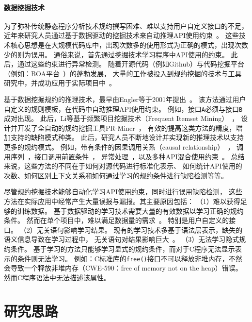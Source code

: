 \paragraph{数据挖掘技术}
为了弥补传统静态程序分析技术规约撰写困难、难以支持用户自定义接口的不足，
近年来研究人员通过基于数据驱动的挖掘技术来自动推理API使用约束~\cite{13survey}。
这些技术核心思想是在大规模代码库中，出现次数多的使用形式为正确的模式，出现次数少的则为误用。
通俗来说，首先通过挖掘技术学习程序中API使用的约束。
此后，通过这些约束进行异常检测。
随着开源代码（例如Github）与代码挖掘平台（例如：BOA平台~\cite{15-tosem-boa}）的蓬勃发展，
大量的工作被投入到规约挖掘的技术与工具研究中，并成功应用于实际项目中~\cite{survey18}。

基于数据挖掘规约的推理技术，最早由Engler等于2001年提出~\cite{01-sosp-mining}。
该方法通过用户自定义的规则模板，在代码中自动推理API使用约束。
例如，接口\texttt{A}必须与接口\texttt{B}成对出现。
此后，Li等基于频繁项目挖掘技术（Frequent Itemset Mining）~\cite{03-fimi-frequent}，
设计并开发了全自动的规约挖掘工具PR-Miner~\cite{05-fse-prminer}，
有效的提高这类方法的精度，增加支持的缺陷模式种类。
此后，研究人员不断地设计并实现新的推理技术以支持更多的规约模式。
例如，带有条件的因果调用关系（causal relationship）~\cite{07-fse-temporal}，
调用序列~\cite{09-ase-sequence}，接口调用前置条件~\cite{14-fse-pre}，
异常处理~\cite{16-ase-apex}，以及多种API混合使用约束~\cite{16-sec-apisan}。
总结来说，这些方法的不同在于如何对源代码进行标准化表示、
如何统计API使用的次数、如何区别上下文关系和如何通过学习的规约条件进行缺陷检测等等。

尽管规约挖掘技术能够自动化学习API使用约束，同时进行误用缺陷检测，
这些方法在实际应用中经常产生大量误报与漏报。其主要原因包括：
（1）难以获得足够的训练数据。
基于数据驱动的学习技术需要大量的有效数据以学习正确的规约条件。
然而在单个项目中，难以满足数据量的需求~\cite{15-kernel-sv,survey18}。
特别是用户自定义的接口。
（2）无关语句影响学习结果。
现有的学习技术多基于语法层表示，缺失的语义信息导致在学习过程中，
无关语句对结果影响巨大~\cite{16-icse-antminer}。
（3）无法学习隐式规约条件。
基于学习的方法只能够学习显式的规约条件，而对于C程序无法显示表示的条件则无法学习。
例如：C标准库的\texttt{free()}接口不可以释放非堆内存，不然会导致一个释放非堆内存（CWE-590：free of memory not on the heap）错误。
然而C程序语法中无法描述该属性。


\section{研究思路}

